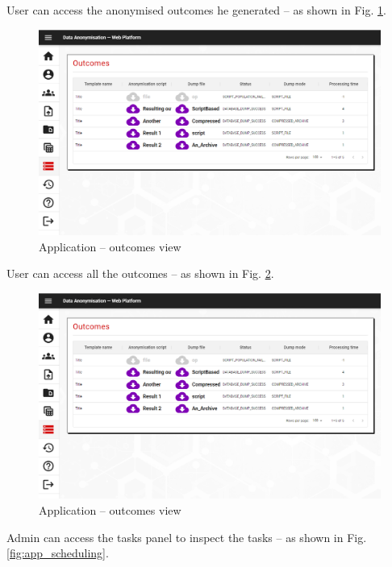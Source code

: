 \documentclass[a4paper,twoside,12pt]{book}
\begin{document}
User can access the anonymised outcomes he generated -- as shown in Fig. \ref{fig:theoutcomes}.

\begin{figure}
  \centering
  \includegraphics[width=\linewidth]{img/app_outcomes.png}
  \caption{Application -- outcomes view}
  \label{fig:theoutcomes}
\end{figure}


User can access all the outcomes -- as shown in Fig. \ref{fig:alloutcomes}.

\begin{figure}
  \centering
  \includegraphics[width=\linewidth]{img/app_outcomes.png}
  \caption{Application -- outcomes view}
  \label{fig:alloutcomes}
\end{figure}

Admin can access the tasks panel to inspect the tasks -- as shown in Fig. \ref{fig:app_scheduling}.
\end{document}
